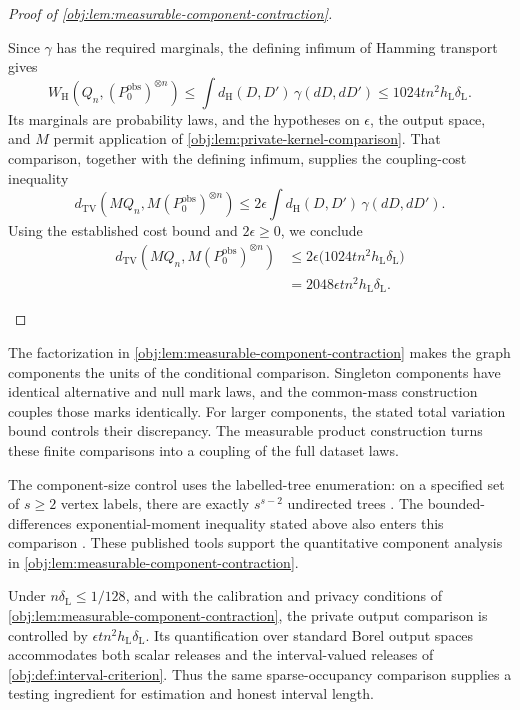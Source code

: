 \documentclass[11pt]{article}
\begin{document}
\begin{proof}[Proof of \cref{obj:lem:measurable-component-contraction}]
\begin{enumerate}
Since \(\gamma\) has the required marginals, the defining infimum of Hamming transport gives
\[
W_{\mathrm H}\!\left(Q_n,(P_0^{\mathrm{obs}})^{\otimes n}\right)
\le
\int d_{\mathrm H}(D,D')\,\gamma(dD,dD')
\le1024tn^2h_{\mathrm L}\delta_{\mathrm L}.
\]
Its marginals are probability laws, and the hypotheses on \(\epsilon\), the output space, and \(M\) permit application of
\cref{obj:lem:private-kernel-comparison}. That comparison, together with the defining infimum, supplies the coupling-cost inequality
\[
d_{\mathrm{TV}}\!\left(MQ_n,M(P_0^{\mathrm{obs}})^{\otimes n}\right)
\le
2\epsilon
\int d_{\mathrm H}(D,D')\,\gamma(dD,dD').
\]
Using the established cost bound and \(2\epsilon\ge0\), we conclude
\[
\begin{aligned}
d_{\mathrm{TV}}\!\left(MQ_n,M(P_0^{\mathrm{obs}})^{\otimes n}\right)
&\le
2\epsilon\bigl(1024tn^2h_{\mathrm L}\delta_{\mathrm L}\bigr)\\
&=
2048\epsilon tn^2h_{\mathrm L}\delta_{\mathrm L}.
\end{aligned}
\]
\end{enumerate}
\end{proof}

The factorization in \cref{obj:lem:measurable-component-contraction} makes the graph components the units of the conditional comparison. Singleton components have identical alternative and null mark laws, and the common-mass construction couples those marks identically. For larger components, the stated total variation bound controls their discrepancy. The measurable product construction turns these finite comparisons into a coupling of the full dataset laws.

The component-size control uses the labelled-tree enumeration: on a specified set of \(s\ge2\) vertex labels, there are exactly \(s^{s-2}\) undirected trees \citep[Section 5.6, Theorem 5.40]{KellerTrotterAppliedCombinatorics}. The bounded-differences exponential-moment inequality stated above also enters this comparison \citep[Theorem 6.2, displayed log-mgf conclusion in its proof, p.~167]{BoucheronLugosiMassart2013}. These published tools support the quantitative component analysis in \cref{obj:lem:measurable-component-contraction}.

Under \(n\delta_{\mathrm L}\le1/128\), and with the calibration and privacy conditions of \cref{obj:lem:measurable-component-contraction}, the private output comparison is controlled by \(\epsilon tn^2h_{\mathrm L}\delta_{\mathrm L}\). Its quantification over standard Borel output spaces accommodates both scalar releases and the interval-valued releases of \cref{obj:def:interval-criterion}. Thus the same sparse-occupancy comparison supplies a testing ingredient for estimation and honest interval length.
\end{document}
